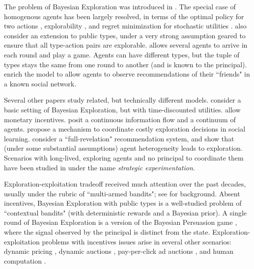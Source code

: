 
The problem of Bayesian Exploration was introduced in \cite{Kremer-JPE14}. The special case of homogenous agents has been largely resolved, in terms of the optimal policy for two actions \cite{Kremer-JPE14}, explorability \cite{ICexplorationGames-ec16}, and regret minimization for stochastic utilities \cite{ICexploration-ec15}. \cite{ICexploration-ec15} also consider an extension to public types, under a very strong assumption geared to ensure that all type-action pairs are explorable. \cite{ICexplorationGames-ec16} allows several agents to arrive in each round and play a game. Agents can have different types, but the tuple of types stays the same from one round to another (and is known to the principal). \cite{Bahar-ec16} enrich the model to allow agents to observe recommendations of their ``friends" in a known social network.

Several other papers study related, but technically different models. \cite{Bimpikis-exploration-ms17} consider a basic setting of Bayesian Exploration, but with time-discounted utilities. \cite{Frazier-ec14} allow monetary incentives. \cite{Che-13} posit a continuous information flow and a continuum of agents. \cite{Bobby-Glen-ec16} propose a mechanism to coordinate costly exploration decisions in social learning. \cite{Sven-aistats18} consider a ``full-revelation" recommendation system, and show that (under some substantial assumptions) agent heterogeneity leads to exploration. Scenarios with long-lived, exploring agents and no principal to coordinate them have been studied in \cite{Bolton-econometrica99,Keller-econometrica05} under the name \emph{strategic experimentation}.

Exploration-exploitation tradeoff received much attention over the past decades, usually under the rubric of ``multi-armed bandits"; see  \cite{Bubeck-survey12,Gittins-book11} for background. Absent incentives, Bayesian Exploration with public types is a well-studied problem of ``contextual bandits" (with deterministic rewards and a Bayesian prior). A single round of Bayesian Exploration is a version of the Bayesian Persuasion game \cite{Kamenica-aer11}, where the signal observed by the principal is distinct from the state. Exploration-exploitation problems with incentives issues arise in several other scenarios: dynamic pricing
    \cite{KleinbergL03,BZ09,BwK-focs13},
dynamic auctions
    \cite{AtheySegal-econometrica13,DynPivot-econometrica10,Kakade-pivot-or13},
pay-per-click ad auctions
    \cite{MechMAB-ec09,DevanurK09,Transform-ec10-jacm},
and human computation
    \cite{RepeatedPA-ec14,Ghosh-itcs13,Krause-www13}.


